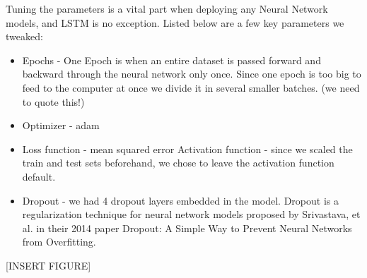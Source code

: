 \documentclass[12pt,oneside]{chicagocapstone}
\providecommand{\tightlist}{%
  \setlength{\itemsep}{0pt}\setlength{\parskip}{0pt}}
\begin{document}
Tuning the parameters is a vital part when deploying any Neural Network
models, and LSTM is no exception. Listed below are a few key parameters
we tweaked:
\begin{itemize}
\tightlist
\item
  Epochs - One Epoch is when an entire dataset is passed forward and
  backward through the neural network only once. Since one epoch is too
  big to feed to the computer at once we divide it in several smaller
  batches. (we need to quote this!)
\item
  Optimizer - adam
\item
  Loss function - mean squared error Activation function - since we
  scaled the train and test sets beforehand, we chose to leave the
  activation function default.
\item
  Dropout - we had 4 dropout layers embedded in the model. Dropout is a
  regularization technique for neural network models proposed by
  Srivastava, et al. in their 2014 paper Dropout: A Simple Way to
  Prevent Neural Networks from Overfitting.
\end{itemize}
{[}INSERT FIGURE{]}
\end{document}
